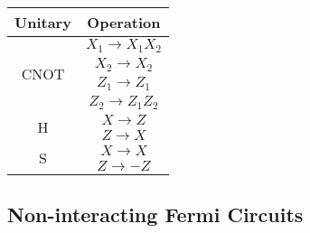 \begin{center}
    \begin{tabular}{ ||c|c|| }
        \hline
        Unitary                 & Operation        \\
        \hline\hline
        \multirow{4}{3em}{CNOT} & $X_1 \to X_1X_2$ \\
                                & $X_2 \to X_2$    \\
                                & $Z_1 \to Z_1$    \\
                                & $Z_2 \to Z_1Z_2$ \\
        \hline
        \multirow{2}{1em}{H}    & $X \to Z$        \\
                                & $Z\to X$         \\
        \hline
        \multirow{2}{1em}{S}    & $X \to X$        \\
                                & $Z \to -Z$       \\
        \hline
    \end{tabular}
\end{center}


\subsection{Non-interacting Fermi Circuits}
